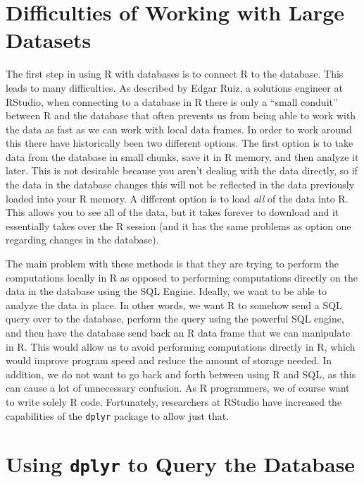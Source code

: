 \documentclass[
]{krantz}
\begin{document}
\hypertarget{difficulties-of-working-with-large-datasets}{%
\section{Difficulties of Working with Large Datasets}\label{difficulties-of-working-with-large-datasets}}

The first step in using R with databases is to connect R to the database. This leads to many difficulties. As described by Edgar Ruiz, a solutions engineer at RStudio, when connecting to a database in R there is only a ``small conduit'' between R and the database that often prevents us from being able to work with the data as fast as we can work with local data frames. In order to work around this there have historically been two different options. The first option is to take data from the database in small chunks, save it in R memory, and then analyze it later. This is not desirable because you aren't dealing with the data directly, so if the data in the database changes this will not be reflected in the data previously loaded into your R memory. A different option is to load \emph{all} of the data into R. This allows you to see all of the data, but it takes forever to download and it essentially takes over the R session (and it has the same problems as option one regarding changes in the database).

The main problem with these methods is that they are trying to perform the computations locally in R as opposed to performing computations directly on the data in the database using the SQL Engine. Ideally, we want to be able to analyze the data in place. In other words, we want R to somehow send a SQL query over to the database, perform the query using the powerful SQL engine, and then have the database send back an R data frame that we can manipulate in R. This would allow us to avoid performing computations directly in R, which would improve program speed and reduce the amount of storage needed. In addition, we do not want to go back and forth between using R and SQL, as this can cause a lot of unnecessary confusion. As R programmers, we of course want to write solely R code. Fortunately, researchers at RStudio have increased the capabilities of the \texttt{dplyr} package to allow just that.

\hypertarget{using-dplyr-to-query-the-database}{%
\section{\texorpdfstring{Using \texttt{dplyr} to Query the Database}{Using dplyr to Query the Database}}\label{using-dplyr-to-query-the-database}}
\end{document}
